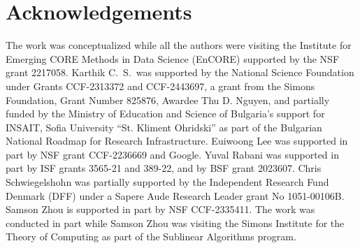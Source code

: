 \documentclass[10pt,a4paper]{amsart}
\begin{document}
\section*{Acknowledgements}
The work was conceptualized while all the authors were visiting the Institute for Emerging CORE Methods in Data Science (EnCORE) supported by the NSF grant 2217058. 
Karthik C.\ S.\ was supported by the National Science Foundation under Grants CCF-2313372 and CCF-2443697, a grant from the Simons Foundation, Grant Number 825876, Awardee Thu D. Nguyen, and partially funded by the Ministry of Education and Science of Bulgaria's support for INSAIT, Sofia University ``St. Kliment Ohridski'' as part of the Bulgarian National Roadmap for Research Infrastructure. Euiwoong Lee was supported in part by NSF grant CCF-2236669 and Google. Yuval Rabani was supported in part by ISF grants 3565-21 and 389-22, and by BSF grant 2023607. Chris Schwiegelshohn was partially supported by the Independent Research Fund
Denmark (DFF) under a Sapere Aude Research Leader grant No 1051-00106B.
Samson Zhou is supported in part by NSF CCF-2335411. 
The work was conducted in part while Samson Zhou was visiting the Simons Institute for the Theory of Computing as part of the Sublinear Algorithms program.
\end{document}
